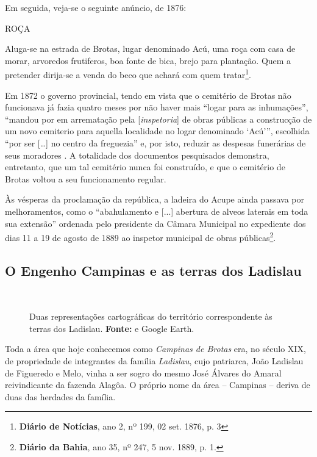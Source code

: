 \begin{citacao}
Em seguida, veja-se o seguinte anúncio, de 1876:

\begin{citacao}
ROÇA

Aluga-se na estrada de Brotas, lugar denominado Acú, uma roça com casa de morar, arvoredos frutiferos, boa fonte de bica, brejo para plantação. Quem a pretender dirija-se a venda do beco que achará com quem tratar\footnote{\textbf{Diário de Notícias}, ano 2, nº 199, 02 set. 1876, p. 3}.
\end{citacao}

Em 1872 o governo provincial, tendo em vista que o cemitério de Brotas não funcionava já fazia quatro meses por não haver mais ``logar para as inhumações'', ``mandou por em arrematação pela [\textit{inspetoria}] de obras públicas a construcção de um novo cemiterio para aquella localidade no logar denominado `Acú''', escolhida ``por ser [\dots] no centro da freguezia'' e, por isto, reduzir as despesas funerárias de seus moradores \cite[p.~12]{bahia_1872}. A totalidade dos documentos pesquisados demonstra, entretanto, que um tal cemitério nunca foi construído, e que o cemitério de Brotas voltou a seu funcionamento regular.

Às vésperas da proclamação da república, a ladeira do Acupe ainda passava por melhoramentos, como o ``abahulamento e [...] abertura de alveos laterais em toda sua extensão'' ordenada pelo presidente da Câmara Municipal no expediente dos dias 11 a 19 de agosto de 1889 ao inspetor municipal de obras públicas\footnote{\textbf{Diário da Bahia}, ano 35, nº 247, 5 nov. 1889, p. 1.}.

\subsection{O Engenho Campinas e as terras dos Ladislau}\label{subsec:campinasladislau}

\begin{figure}[!htp]
\centering
{}
\  %
\caption{Duas representações cartográficas do território correspondente às terras dos Ladislau. \textbf{Fonte:}  e Google Earth.}
\end{figure}

Toda a área que hoje conhecemos como \textit{Campinas de Brotas} era, no século XIX, de propriedade de integrantes da família \textit{Ladislau}, cujo patriarca, João Ladislau de Figueredo e Melo, vinha a ser sogro do mesmo José Álvares do Amaral reivindicante da fazenda Alagôa. O próprio nome da área -- Campinas -- deriva de duas das herdades da família.


\end{citacao}
